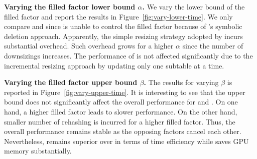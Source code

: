 \vspace{1mm}\noindent\textbf{Varying the filled factor lower bound $\alpha$.}
We vary the lower bound of the filled factor and report the results in Figure~\ref{fig:vary-lower-time}. 
We only compare \megakv and \voter since \slab is unable to control the filled factor because of \slab's symbolic deletion approach. 
Apparently, the simple resizing strategy adopted by \megakv incurs substantial overhead. Such overhead grows for a higher $\alpha$ since the number of downsizings increases. The performance of \voter is not affected significantly due to the incremental resizing approach by updating only one subtable at a time. 



\vspace{1mm}\noindent\textbf{Varying the filled factor upper bound $\beta$.}
The results for varying $\beta$ is reported in Figure~\ref{fig:vary-upper-time}. 
It is interesting to see that the upper bound does not significantly affect the overall performance for \megakv and \voter. 
On one hand, a higher filled factor leads to slower  performance. On the other hand, smaller number of rehashing is incurred for a higher filled factor. Thus, the overall performance remains stable as the opposing factors cancel each other. Nevertheless, \voter remains superior over \megakv in terms of time efficiency while saves GPU memory substantially.


